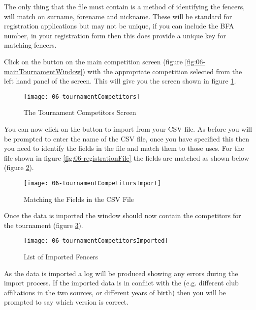 \documentclass[a4paper,11pt]{memoir}
\begin{document}
The only thing that the file must contain is a method of identifying the fencers, \fencingtime{} will match on surname, forename and nickname. These will be standard for registration applications but may not be unique, if you can include the BFA number, in your registration form then this does provide a unique key for matching fencers. 

Click on the   button on the main competition screen (figure \ref{fig:06-mainTournamentWindow}) with the appropriate competition selected from the left hand panel of the screen. This will give you the screen shown in figure \ref{fig:06-tournamentCompetitors}.

\begin{figure}[!ht]
 \centering
 \texttt{[image: 06-tournamentCompetitors]}
 \caption{The Tournament Competitors Screen} \label{fig:06-tournamentCompetitors}
\end{figure}

You can now click on the  button to import from your CSV file. As before you will be prompted to enter the name of the CSV file, once you have specified this then you need to identify the fields in the file and match them to those \fencingtime{} uses. For the file shown in figure \ref{fig:06-registrationFile} the fields are matched as shown below (figure \ref{fig:06-tournamentCompetitorsImport}).

\begin{figure}[!ht]
 \centering
 \texttt{[image: 06-tournamentCompetitorsImport]}
 \caption{Matching the Fields in the CSV File} \label{fig:06-tournamentCompetitorsImport}
\end{figure}

Once the data is imported the window should now contain the competitors for the tournament (figure \ref{fig:06-tournamentCompetitorsImported}).

\begin{figure}[!ht]
 \centering
 \texttt{[image: 06-tournamentCompetitorsImported]}
 \caption{List of Imported Fencers} \label{fig:06-tournamentCompetitorsImported}
\end{figure}

As the data is imported a log will be produced showing any errors during the import process. If the imported data is in conflict with the  (e.g. different club affiliations in the two sources, or different years of birth) then you will be prompted to say which version is correct.
\end{document}
